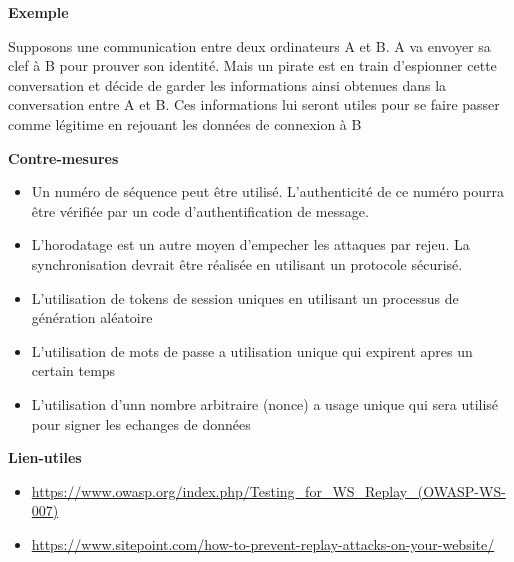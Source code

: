 \bigskip

\begin{flushleft}
\textbf{Exemple}
\end{flushleft}

\smallskip

\begin{flushleft}
Supposons une communication entre deux ordinateurs A et B. A va envoyer sa clef à B pour prouver son identité. Mais un pirate est en train d'espionner cette conversation et décide de garder les informations ainsi obtenues dans la conversation entre A et B. Ces informations lui seront utiles pour se faire passer comme légitime en rejouant les données de connexion à B
\end{flushleft}

\bigskip


\begin{flushleft}
\textbf{Contre-mesures}
\end{flushleft}

\smallskip

\begin{itemize}
\item Un numéro de séquence peut être utilisé. L'authenticité de ce numéro pourra être vérifiée par un code d'authentification de message.
\item L'horodatage est un autre moyen d'empecher les attaques par rejeu. La synchronisation devrait être réalisée en utilisant un protocole sécurisé.
\item L'utilisation de tokens de session uniques en utilisant un processus de génération aléatoire
\item L'utilisation de mots de passe a utilisation unique qui expirent apres un certain temps
\item L'utilisation d'unn nombre arbitraire (nonce) a usage unique qui sera utilisé pour signer les echanges de données
\end{itemize}

\bigskip

\begin{flushleft}
\textbf{Lien-utiles}
\end{flushleft}

\begin{itemize}
\item \url{https://www.owasp.org/index.php/Testing_for_WS_Replay_(OWASP-WS-007)}
\item \url{https://www.sitepoint.com/how-to-prevent-replay-attacks-on-your-website/}
\end{itemize}

\endinput
